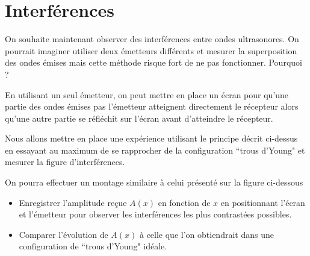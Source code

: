 \documentclass[]{tp}
\begin{document}
\section{Interférences}%
\label{sec:interferences}

On souhaite maintenant observer des interférences entre ondes ultrasonores. On pourrait imaginer utiliser deux émetteurs différents et mesurer la superposition des ondes émises mais cette méthode risque fort de ne pas fonctionner. Pourquoi ?

En utilisant un seul émetteur, on peut mettre en place un écran pour qu'une partie des ondes émises pas l'émetteur atteignent directement le récepteur alors qu'une autre partie se réfléchit sur l'écran avant d'atteindre le récepteur.

Nous allons mettre en place une expérience utilisant le principe décrit ci-dessus en essayant au maximum de se rapprocher de la configuration ``trous d'Young" et mesurer la figure d'interférences. 

On pourra effectuer un montage similaire à celui présenté sur la figure ci-dessous

\begin{center}
\end{center}

\begin{itemize}
  \item Enregistrer l'amplitude reçue $A(x)$ en fonction de $x$ en positionnant l'écran et l'émetteur pour observer les interférences les plus contrastées possibles. 

  \item Comparer l'évolution de $A(x)$ à celle que l'on obtiendrait dans une configuration de ``trous d'Young" idéale. 
\end{itemize}
\end{document}
